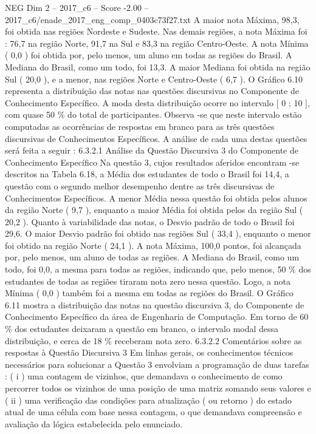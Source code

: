 \begin{textsample}{NEG Dim 2 – 2017\_c6 – Score -2.00 – 2017\_c6/enade\_2017\_eng\_comp\_0403c73f27.txt}
A maior nota Máxima, 98,3, foi obtida nas regiões Nordeste e Sudeste.
Nas demais regiões, a nota Máxima foi : 76,7 na região Norte, 91,7 na Sul e 83,3 na região Centro-Oeste.
A nota Mínima ( 0,0 ) foi obtida por, pelo menos, um aluno em todas as regiões do Brasil.
A Mediana do Brasil, como um todo, foi 13,3.
A maior Mediana foi obtida na região Sul ( 20,0 ), e a menor, nas regiões Norte e Centro-Oeste ( 6,7 ).
O Gráfico 6.10 representa a distribuição das notas nas questões discursivas no Componente de Conhecimento Específico.
A moda desta distribuição ocorre no intervalo [ 0 ; 10 ], com quase 50 \% do total de participantes.
Observa -se que neste intervalo estão computadas as ocorrências de respostas em branco para as três questões discursivas de Conhecimentos Específicos.
A análise de cada uma destas questões será feita a seguir : 6.3.2.1 Análise da Questão Discursiva 3 do Componente de Conhecimento Específico Na questão 3, cujos resultados aferidos encontram -se descritos na Tabela 6.18, a Média dos estudantes de todo o Brasil foi 14,4, a questão com o segundo melhor desempenho dentre as três discursivas de Conhecimentos Específicos.
A menor Média nessa questão foi obtida pelos alunos da região Norte ( 9,7 ), enquanto a maior Média foi obtida pelos da região Sul ( 20,2 ).
Quanto à variabilidade das notas, o Desvio padrão de todo o Brasil foi 29,6.
O maior Desvio padrão foi obtido nas regiões Sul ( 33,4 ), enquanto o menor foi obtido na região Norte ( 24,1 ).
A nota Máxima, 100,0 pontos, foi alcançada por, pelo menos, um aluno de todas as regiões.
A Mediana do Brasil, como um todo, foi 0,0, a mesma para todas as regiões, indicando que, pelo menos, 50 \% dos estudantes de todas as regiões tiraram nota zero nessa questão.
Logo, a nota Mínima ( 0,0 ) também foi a mesma em todas as regiões do Brasil.
O Gráfico 6.11 mostra a distribuição das notas na questão discursiva 3, do Componente de Conhecimento Específico da área de Engenharia de Computação.
Em torno de 60 \% dos estudantes deixaram a questão em branco, o intervalo modal dessa distribuição, e cerca de 18 \% receberam nota zero. 6.3.2.2 Comentários sobre as respostas à Questão Discursiva 3 Em linhas gerais, os conhecimentos técnicos necessários para solucionar a Questão 3 envolviam a programação de duas tarefas : ( i ) uma contagem de vizinhos, que demandava o conhecimento de como percorrer todos os vizinhos de uma posição de uma matriz somando seus valores e ( ii ) uma verificação das condições para atualização ( ou retorno ) do estado atual de uma célula com base nessa contagem, o que demandava compreensão e avaliação da lógica estabelecida pelo enunciado.

\end{textsample}
